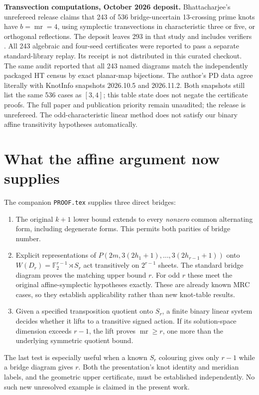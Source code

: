 \documentclass[11pt]{article}
\newcommand{\mr}{\operatorname{mr}}
\newcommand{\F}{\mathbb F}
\begin{document}
\textbf{Transvection computations, October 2026 deposit.}
Bhattacharjee's unrefereed release claims that 243 of 536 bridge-uncertain
13-crossing prime knots have $b=\mr=4$, using symplectic transvections in
characteristic three or five, or orthogonal reflections. The deposit
leaves 293 in that study and includes verifiers \cite{deposit}. All 243
algebraic and four-seed certificates were reported to pass a separate
standard-library replay. Its receipt is not distributed in this curated
checkout. The same audit reported that all 243 named diagrams match the
independently packaged HT census
by exact planar-map bijections. The author's PD data agree literally
with KnotInfo snapshots 2026.10.5 and 2026.11.2. Both snapshots still list
the same 536 cases as $[3,4]$; this table state does not negate the
certificate proofs. The full paper and publication priority remain
unaudited; the release is unrefereed.
The odd-characteristic linear method
does not satisfy our binary affine transitivity hypotheses automatically.

\section{What the affine argument now supplies}

The companion \texttt{PROOF.tex} supplies three direct bridges:
\begin{enumerate}
\item The original $k+1$ lower bound extends to every \emph{nonzero}
common alternating form, including degenerate forms. This permits both
parities of bridge number.
\item Explicit representations of
$P(2m,3(2h_1+1),\ldots,3(2h_{r-1}+1))$ onto
$W(D_r)=\F_2^{r-1}\rtimes S_r$ act transitively on $2^{r-1}$ sheets.
The standard bridge diagram proves the matching upper bound $r$.
For odd $r$ these meet the original affine-symplectic hypotheses exactly.
These are already known MRC cases, so they establish applicability rather
than new knot-table results.
\item Given a specified transposition quotient onto $S_r$, a finite
binary linear system decides whether it lifts to a transitive signed
action. If its solution-space dimension exceeds $r-1$, the lift proves
$\mr\ge r$, one more than the underlying symmetric quotient bound.
\end{enumerate}

The last test is especially useful when a known $S_r$ colouring gives only
$r-1$ while a bridge diagram gives $r$. Both the presentation's knot
identity and meridian labels, and the geometric upper certificate, must
be established independently. No such new unresolved example is claimed
in the present work.
\end{document}
